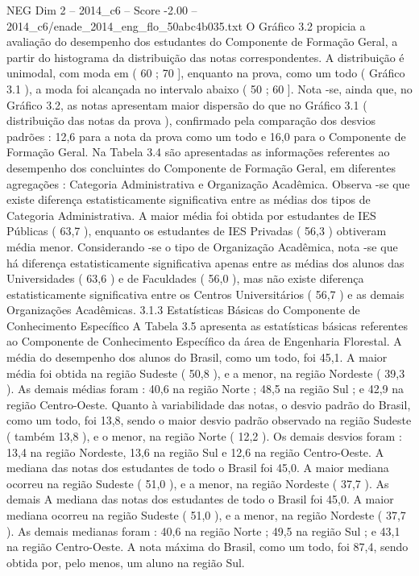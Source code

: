 \begin{textsample}{NEG Dim 2 – 2014\_c6 – Score -2.00 – 2014\_c6/enade\_2014\_eng\_flo\_50abc4b035.txt}
O Gráfico 3.2 propicia a avaliação do desempenho dos estudantes do Componente de Formação Geral, a partir do histograma da distribuição das notas correspondentes.
A distribuição é unimodal, com moda em ( 60 ; 70 ], enquanto na prova, como um todo ( Gráfico 3.1 ), a moda foi alcançada no intervalo abaixo ( 50 ; 60 ].
Nota -se, ainda que, no Gráfico 3.2, as notas apresentam maior dispersão do que no Gráfico 3.1 ( distribuição das notas da prova ), confirmado pela comparação dos desvios padrões : 12,6 para a nota da prova como um todo e 16,0 para o Componente de Formação Geral.
Na Tabela 3.4 são apresentadas as informações referentes ao desempenho dos concluintes do Componente de Formação Geral, em diferentes agregações : Categoria Administrativa e Organização Acadêmica.
Observa -se que existe diferença estatisticamente significativa entre as médias dos tipos de Categoria Administrativa.
A maior média foi obtida por estudantes de IES Públicas ( 63,7 ), enquanto os estudantes de IES Privadas ( 56,3 ) obtiveram média menor.
Considerando -se o tipo de Organização Acadêmica, nota -se que há diferença estatisticamente significativa apenas entre as médias dos alunos das Universidades ( 63,6 ) e de Faculdades ( 56,0 ), mas não existe diferença estatisticamente significativa entre os Centros Universitários ( 56,7 ) e as demais Organizações Acadêmicas. 3.1.3 Estatísticas Básicas do Componente de Conhecimento Específico A Tabela 3.5 apresenta as estatísticas básicas referentes ao Componente de Conhecimento Específico da área de Engenharia Florestal.
A média do desempenho dos alunos do Brasil, como um todo, foi 45,1.
A maior média foi obtida na região Sudeste ( 50,8 ), e a menor, na região Nordeste ( 39,3 ).
As demais médias foram : 40,6 na região Norte ; 48,5 na região Sul ; e 42,9 na região Centro-Oeste.
Quanto à variabilidade das notas, o desvio padrão do Brasil, como um todo, foi 13,8, sendo o maior desvio padrão observado na região Sudeste ( também 13,8 ), e o menor, na região Norte ( 12,2 ).
Os demais desvios foram : 13,4 na região Nordeste, 13,6 na região Sul e 12,6 na região Centro-Oeste.
A mediana das notas dos estudantes de todo o Brasil foi 45,0.
A maior mediana ocorreu na região Sudeste ( 51,0 ), e a menor, na região Nordeste ( 37,7 ).
As demais A mediana das notas dos estudantes de todo o Brasil foi 45,0.
A maior mediana ocorreu na região Sudeste ( 51,0 ), e a menor, na região Nordeste ( 37,7 ).
As demais medianas foram : 40,6 na região Norte ; 49,5 na região Sul ; e 43,1 na região Centro-Oeste.
A nota máxima do Brasil, como um todo, foi 87,4, sendo obtida por, pelo menos, um aluno na região Sul.

\end{textsample}
